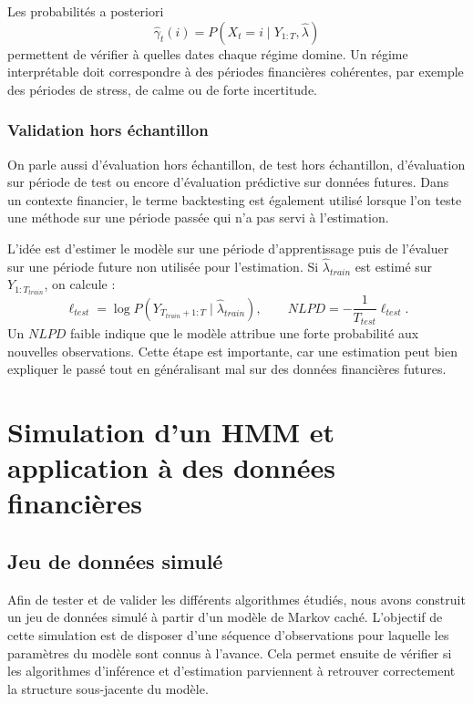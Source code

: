 \documentclass[11pt]{article}
\begin{document}
Les probabilités a posteriori
\[
\widehat{\gamma}_t(i)=P(X_t=i\mid Y_{1:T},\widehat{\lambda})
\]
permettent de vérifier à quelles dates chaque régime domine. Un régime interprétable doit correspondre à des périodes financières cohérentes, par exemple des périodes de stress, de calme ou de forte incertitude.

\subsubsection{Validation hors échantillon}

On parle aussi d'évaluation hors échantillon, de test hors échantillon, d'évaluation sur période de test ou encore d'évaluation prédictive sur données futures. Dans un contexte financier, le terme backtesting est également utilisé lorsque l'on teste une méthode sur une période passée qui n'a pas servi à l'estimation.

L'idée est d'estimer le modèle sur une période d'apprentissage puis de l'évaluer sur une période future non utilisée pour l'estimation. Si \(\widehat{\lambda}_{train}\) est estimé sur \(Y_{1:T_{train}}\), on calcule :
\[
\ell_{test}
=
\log P(Y_{T_{train}+1:T}\mid \widehat{\lambda}_{train}),
\qquad
NLPD=-\frac{1}{T_{test}}\ell_{test}.
\]
Un \(NLPD\) faible indique que le modèle attribue une forte probabilité aux nouvelles observations. Cette étape est importante, car une estimation peut bien expliquer le passé tout en généralisant mal sur des données financières futures.


\newpage


\section{Simulation d'un HMM et application à des données financières}

\subsection{Jeu de données simulé}

Afin de tester et de valider les différents algorithmes étudiés, nous avons construit un jeu de données simulé à partir d'un modèle de Markov caché. L'objectif de cette simulation est de disposer d'une séquence d'observations pour laquelle les paramètres du modèle sont connus à l'avance. Cela permet ensuite de vérifier si les algorithmes d'inférence et d'estimation parviennent à retrouver correctement la structure sous-jacente du modèle.
\end{document}
